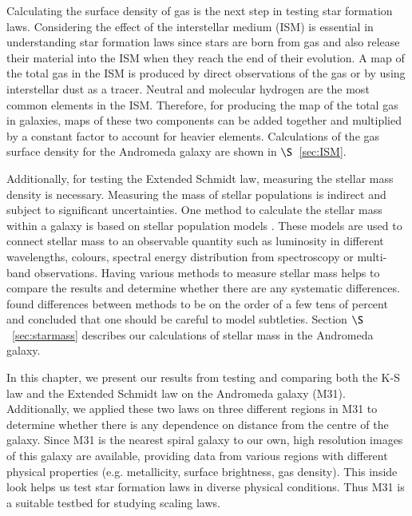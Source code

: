 Calculating the surface density of gas is the next step in testing star formation laws.
Considering the effect of the interstellar medium (ISM) is essential in understanding star formation laws since stars are born from gas and also release their material into the ISM when they reach the end of their evolution. 
A map of the total gas in the ISM is produced by direct observations of the gas or by using interstellar dust as a tracer. Neutral and molecular hydrogen are the most common elements in the ISM. Therefore, for producing the map of the total gas in galaxies, maps of these two components can be added together and multiplied by a constant factor to account for heavier elements. 
Calculations of the gas surface density for the Andromeda galaxy are shown in $\S$~\ref{sec:ISM}. 

Additionally, for testing the Extended Schmidt law, measuring the stellar mass density is necessary. Measuring the mass of stellar populations is indirect and subject to significant uncertainties. One method to calculate the stellar mass within a galaxy is based on stellar population models \citep[e.g.][]{ Bruzual93, Kotulla09}. These models are used to connect stellar mass to an observable quantity such as luminosity in different wavelengths, colours, spectral energy distribution from spectroscopy or multi-band observations.
Having various methods to measure stellar mass helps to compare the results and determine whether there are any systematic differences. 
\citep{McLaughlin05} found differences between methods to be on the order of a few tens of percent and concluded that one should be careful to model subtleties.
Section $\S$~\ref{sec:starmass} describes our calculations of stellar mass in the Andromeda galaxy.

In this chapter, we present our results from testing and comparing both the K-S law and the Extended Schmidt law on the Andromeda galaxy (M31). Additionally, we applied these two laws on three different regions in M31 to determine whether there is any dependence on distance from the centre of the galaxy. Since M31 is the nearest spiral galaxy to our own, high resolution images of this galaxy are available, providing data from various regions with different physical properties (e.g. metallicity, surface brightness, gas density). This inside look helps us test star formation laws in diverse physical conditions. Thus M31 is a suitable testbed for studying scaling laws.


